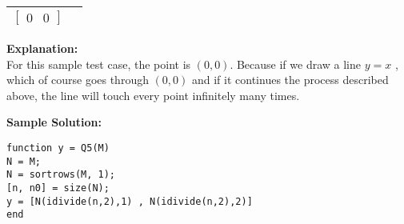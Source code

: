 \documentclass[11pt,paper=a4,answers]{exam}
\begin{document}
\begin{questions}
\begin{center}
\begin{tabular}{|c|c|}
$
\begin{bmatrix}
0 & 0
\end{bmatrix}
$ \\
\hline
\end{tabular}
\end{center}

\textbf{Explanation:} \\
For this sample test case, the point is $(0, 0)$. Because if we draw a line $y = x$ , which of course goes through $(0,0)$ and if it continues the process described above, the line will touch every point infinitely many times.
\\
\newpage

\textbf{Sample Solution:}

\lstset{language=Octave, frame=shadowbox}
\begin{lstlisting}
function y = Q5(M)
N = M;
N = sortrows(M, 1);
[n, n0] = size(N);
y = [N(idivide(n,2),1) , N(idivide(n,2),2)] 
end
\end{lstlisting}
\droppoints
\newpage

\end{questions}
\end{document}
